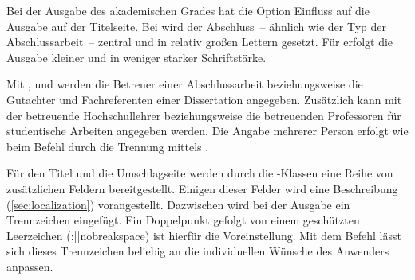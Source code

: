 \begin{DeclareEntity*}{}
\begin{DeclareEntity*}{}
\begin{DeclareEntity*}{}
\begin{Declaration}
Bei der Ausgabe des akademischen Grades hat die Option  
Einfluss auf die Ausgabe auf der Titelseite. Bei  
wird der Abschluss~-- ähnlich wie der Typ der Abschlussarbeit~-- zentral und in 
relativ großen Lettern gesetzt. Für  erfolgt die 
Ausgabe kleiner und in weniger starker Schriftstärke.
\end{Declaration}

\begin{Declaration}
  {}
\begin{Declaration}
  {}
\begin{Declaration}
  {}
\begin{Declaration}
  {}
Mit ,  und  werden die Betreuer 
einer Abschlussarbeit beziehungsweise die Gutachter und Fachreferenten einer 
Dissertation angegeben. Zusätzlich kann mit  der betreuende 
Hochschullehrer beziehungsweise die betreuenden Professoren für studentische 
Arbeiten angegeben werden. Die Angabe mehrerer Person erfolgt wie beim Befehl 
 durch die Trennung mittels .
\end{Declaration}
\end{Declaration}
\end{Declaration}
\end{Declaration}

\begin{Declaration}
  {}
%
Für den Titel und die Umschlagseite werden durch die \TUDScript-Klassen eine 
Reihe von zusätzlichen Feldern bereitgestellt. Einigen dieser Felder wird eine 
Beschreibung (\autoref{sec:localization}) vorangestellt. Dazwischen 
wird bei der Ausgabe ein Trennzeichen eingefügt. Ein Doppelpunkt gefolgt von 
einem geschützten Leerzeichen (:\Macro||{nobreakspace}) ist hierfür die 
Voreinstellung. Mit dem Befehl  lässt sich dieses 
Trennzeichen beliebig an die individuellen Wünsche des Anwenders anpassen.
%
\end{Declaration}


\end{DeclareEntity*}
\end{DeclareEntity*}
\end{DeclareEntity*}
